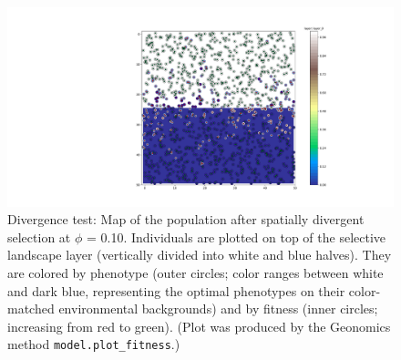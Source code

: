 ﻿\documentclass{article}
\begin{document}
\begin{figure}[!p]
        \includegraphics[width=175mm]{./img/final/DIVERGENCE_pop_plot.pdf}
        \caption{Divergence test: Map of the population after
                 spatially divergent selection at $\phi$ = 0.10.
                 Individuals are plotted on top of the selective landscape layer
                 (vertically divided into white and blue halves).
                 They are colored by phenotype (outer circles;
                 color ranges between white and dark blue,
                 representing the optimal phenotypes on
                 their color-matched environmental backgrounds)
                 and by fitness (inner circles; increasing from red to green).
                 (Plot was produced by the Geonomics method
                 \texttt{model.plot\_fitness}.)}
       \label{fig:div_pop}
\end{figure}
\end{document}

